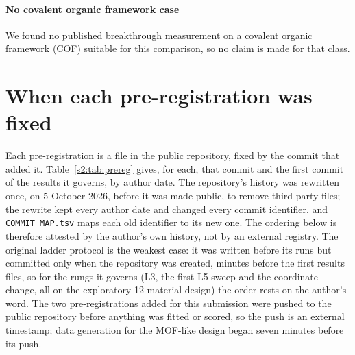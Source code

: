 \paragraph{No covalent organic framework case} We found no published breakthrough
measurement on a covalent organic framework (COF) suitable for this comparison, so no
claim is made for that class.

\section{When each pre-registration was fixed}
\label{s2:prereg}

Each pre-registration is a file in the public repository, fixed by the commit that added
it. Table~\ref{s2:tab:prereg} gives, for each, that commit and the first commit of the results
it governs, by author date. The repository's history was rewritten once, on 5 October 2026,
before it was made public, to remove third-party files; the rewrite kept every author date
and changed every commit identifier, and \texttt{COMMIT\_MAP.tsv} maps each old identifier
to its new one. The ordering below is therefore attested by the author's own history, not by
an external registry. The original ladder protocol is the weakest case: it was written before
its runs but committed only when the repository was created, minutes before the first
results files, so for the rungs it governs (L3, the first L5 sweep and the coordinate
change, all on the exploratory 12-material design) the order rests on the author's word. The
two pre-registrations added for this submission were pushed to the public repository before
anything was fitted or scored, so the push is an external timestamp; data generation for
the MOF-like design began seven minutes before its push.

